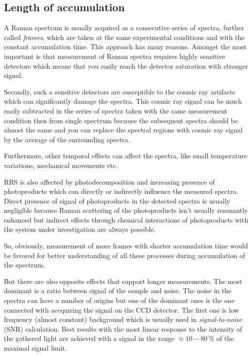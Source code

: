 \subsection{Length of accumulation}

A Raman spectrum is usually acquired as a consecutive series of spectra,
further called \emph{frames}, which are taken at the same experimental
conditions and with the constant accumulation time. This approach has many
reasons. Amongst the most important is that measurement of Raman spectra
requires highly sensitive detectors which means that you easily reach the
detector saturation with stronger signal.

Secondly, such a sensitive detectors are susceptible to the cosmic ray
artifacts which can significantly damage the spectra. This cosmic ray signal
can be much easily subtracted in the series of spectra taken with the same
measurement condition then from single spectrum because the subsequent
spectra should be almost the same and you can replace the spectral regions
with cosmic ray signal by the average of the surrounding spectra.

Furthermore, other temporal effects can affect the spectra, like small
temperature variations, mechanical movements etc.

RRS is also affected by photodecomposition and increasing presence of
photoproducts which can directly or indirectly influence the measured spectra.
Direct presence of signal of photoproducts in the detected spectra is usually
negligible because Raman scattering of the photoproducts isn't usually
resonantly enhanced but indirect effects through chemical interactions of
photoproducts with the system under investigation are always possible.

So, obviously, measurement of more frames with shorter accumulation time would
be favored for better understanding of all these processes during accumulation
of the spectrum.

But there are also opposite effects that support longer measurements. The most
dominant is a ratio between signal of the sample and noise. The noise in the
spectra can have a number of origins but one of the dominant ones is the one
connected with accquiring the signal on the CCD detector. The first one is low
frequency (almost constant) background which is usually used in
\emph{signal-to-noise} (SNR) calculation. Best results with the most linear
response to the intensity of the gathered light are achieved with a signal in
the range $\approx 10 - 80\,\%$ of the maximal signal limit.

